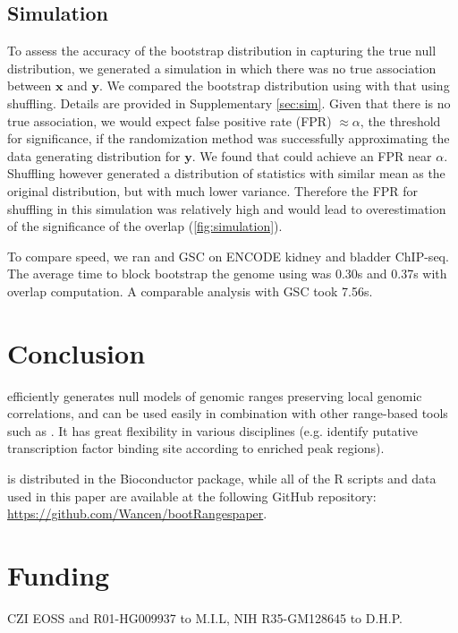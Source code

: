 \subsection{Simulation}

To assess the accuracy of the bootstrap distribution in capturing
the true null distribution, we generated a simulation in which
there was no true association between $\bm{x}$ and $\bm{y}$. 
We compared the bootstrap distribution using \bootranges 
with that using shuffling. Details are provided in Supplementary
\cref{sec:sim}. 
Given that there is no true association, we would expect false
positive rate (FPR) $\approx \alpha$, 
the threshold for significance, if the randomization method was 
successfully approximating the data generating distribution for $\bm{y}$.
We found that \bootranges could achieve an FPR near $\alpha$. 
Shuffling however generated a distribution of statistics
with similar mean as the original distribution, but with much lower
variance.
Therefore the FPR for shuffling in this simulation was relatively high 
and would lead to overestimation of the significance of the overlap 
(\cref{fig:simulation}).

To compare speed, we ran \bootranges and GSC on
ENCODE kidney and bladder ChIP-seq. The average time to
block bootstrap the genome using \bootranges was 0.30s and
0.37s with overlap computation. A comparable analysis with GSC took
7.56s.

\section{Conclusion}

\bootranges efficiently generates null models of genomic ranges preserving 
local genomic correlations, and can be used easily in combination with
other range-based tools such as \plyranges.
It has great flexibility in various disciplines (e.g. identify
putative transcription factor binding site according to enriched peak
regions).

\bootranges is distributed in the \nullranges Bioconductor package,
while all of the R scripts and data used in this paper are available
at the following GitHub repository: 
\url{https://github.com/Wancen/bootRangespaper}.


\section*{Funding}
CZI EOSS and R01-HG009937 to M.I.L, NIH R35-GM128645 to D.H.P.

